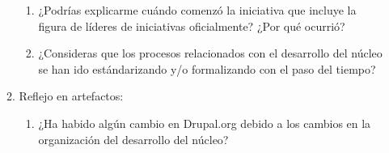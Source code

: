 \begin{enumerate}
\begin{enumerate}
\begin{enumerate}
				\item ¿Podrías explicarme cuándo comenzó la iniciativa que incluye la figura de líderes de iniciativas oficialmente? ¿Por qué ocurrió?
				\item ¿Consideras que los procesos relacionados con el desarrollo del núcleo se han ido estándarizando y/o formalizando con el paso del tiempo?
			\end{enumerate}		
			\item Reflejo en artefactos:
			\begin{enumerate}		
				\item ¿Ha habido algún cambio en Drupal.org debido a los cambios en la organización del desarrollo del núcleo? 
			\end{enumerate}
		\end{enumerate}
		

\end{enumerate}

